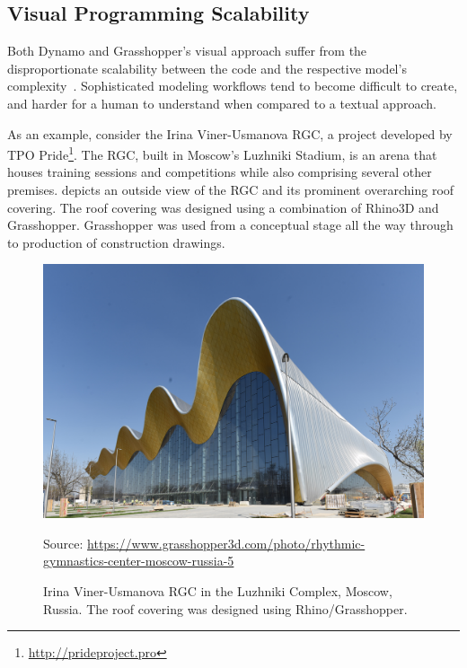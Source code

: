 \subsection{Visual Programming Scalability}%
\label{sec:related.ad.vpl-scalability}

Both Dynamo and Grasshopper's visual approach suffer from the disproportionate
scalability between the code and the respective model's
complexity~\cite{Leitao:2013:PESLGD}.  Sophisticated modeling workflows tend to
become difficult to create, and harder for a human to understand when compared
to a textual approach.

As an example, consider the Irina Viner-Usmanova \ac{RGC}, a project developed
by TPO Pride\footnote{\url{http://prideproject.pro}}.  The \ac{RGC}, built in
Moscow's Luzhniki Stadium, is an arena that houses training sessions and
competitions while also comprising several other premises.
 depicts an outside view of the
\ac{RGC} and its prominent overarching roof covering.  The roof covering was
designed using a combination of Rhino3D and Grasshopper.  Grasshopper was used
from a conceptual stage all the way through to production of construction
drawings.

\begin{figure}[htb]
  \includegraphics[width=\linewidth]{fig/rgc}
  \begin{minipage}{\linewidth}
  \scriptsize Source:
  \url{https://www.grasshopper3d.com/photo/rhythmic-gymnastics-center-moscow-russia-5}
  \end{minipage}
  \caption[\acl{RGC} in the Luzhniki Complex]{
    Irina Viner-Usmanova \ac{RGC} in the Luzhniki Complex, Moscow, Russia.  The
    roof covering was designed using Rhino/Grasshopper.}%
  \label{fig:related.ad.vpl-scalability.rgc}
\end{figure}

